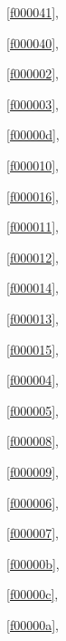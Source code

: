 ﻿



\noindent\filesourcenumbernameone\ \ref{f000041},\ \pageref{f000041}%

\noindent\filesourcenumbernameone\ \ref{f000040},\ \pageref{f000040}%

\noindent\filesourcenumbernameone\ \ref{f000002},\ \pageref{f000002}%

\noindent\filesourcenumbernameone\ \ref{f000003},\ \pageref{f000003}%

\noindent\filesourcenumbernameone\ \ref{f00000d},\ \pageref{f00000d}%

\noindent\filesourcenumbernameone\ \ref{f000010},\ \pageref{f000010}%

\noindent\filesourcenumbernameone\ \ref{f000016},\ \pageref{f000016}%

\noindent\filesourcenumbernameone\ \ref{f000011},\ \pageref{f000011}%

\noindent\filesourcenumbernameone\ \ref{f000012},\ \pageref{f000012}%

\noindent\filesourcenumbernameone\ \ref{f000014},\ \pageref{f000014}%

\noindent\filesourcenumbernameone\ \ref{f000013},\ \pageref{f000013}%

\noindent\filesourcenumbernameone\ \ref{f000015},\ \pageref{f000015}%

\noindent\filesourcenumbernameone\ \ref{f000004},\ \pageref{f000004}%

\noindent\filesourcenumbernameone\ \ref{f000005},\ \pageref{f000005}%

\noindent\filesourcenumbernameone\ \ref{f000008},\ \pageref{f000008}%

\noindent\filesourcenumbernameone\ \ref{f000009},\ \pageref{f000009}%

\noindent\filesourcenumbernameone\ \ref{f000006},\ \pageref{f000006}%

\noindent\filesourcenumbernameone\ \ref{f000007},\ \pageref{f000007}%

\noindent\filesourcenumbernameone\ \ref{f00000b},\ \pageref{f00000b}%

\noindent\filesourcenumbernameone\ \ref{f00000c},\ \pageref{f00000c}%

\noindent\filesourcenumbernameone\ \ref{f00000a},\ \pageref{f00000a}%

